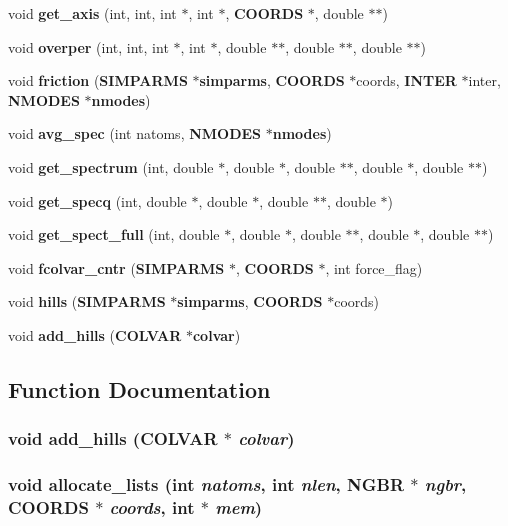 \begin{CompactItemize}
\item 
void {\bf get\_\-axis} (int, int, int $\ast$, int $\ast$, {\bf COORDS} $\ast$, double $\ast$$\ast$)
\item 
void {\bf overper} (int, int, int $\ast$, int $\ast$, double $\ast$$\ast$, double $\ast$$\ast$, double $\ast$$\ast$)
\item 
void {\bf friction} ({\bf SIMPARMS} $\ast${\bf simparms}, {\bf COORDS} $\ast$coords, {\bf INTER} $\ast$inter, {\bf NMODES} $\ast${\bf nmodes})
\item 
void {\bf avg\_\-spec} (int natoms, {\bf NMODES} $\ast${\bf nmodes})
\item 
void {\bf get\_\-spectrum} (int, double $\ast$, double $\ast$, double $\ast$$\ast$, double $\ast$, double $\ast$$\ast$)
\item 
void {\bf get\_\-specq} (int, double $\ast$, double $\ast$, double $\ast$$\ast$, double $\ast$)
\item 
void {\bf get\_\-spect\_\-full} (int, double $\ast$, double $\ast$, double $\ast$$\ast$, double $\ast$, double $\ast$$\ast$)
\item 
void {\bf fcolvar\_\-cntr} ({\bf SIMPARMS} $\ast$, {\bf COORDS} $\ast$, int force\_\-flag)
\item 
void {\bf hills} ({\bf SIMPARMS} $\ast${\bf simparms}, {\bf COORDS} $\ast$coords)
\item 
void {\bf add\_\-hills} ({\bf COLVAR} $\ast${\bf colvar})
\end{CompactItemize}


\subsection{Function Documentation}
\subsubsection{\setlength{\rightskip}{0pt plus 5cm}void add\_\-hills ({\bf COLVAR} $\ast$ {\em colvar})}\label{energy_2proto__energy_8h_eeed85c37ce6adb67a3aa6b0525febb3}


\subsubsection{\setlength{\rightskip}{0pt plus 5cm}void allocate\_\-lists (int {\em natoms}, int {\em nlen}, {\bf NGBR} $\ast$ {\em ngbr}, {\bf COORDS} $\ast$ {\em coords}, int $\ast$ {\em mem})}\label{energy_2proto__energy_8h_8540220cab7e209c3a9f81f034bc582f}



